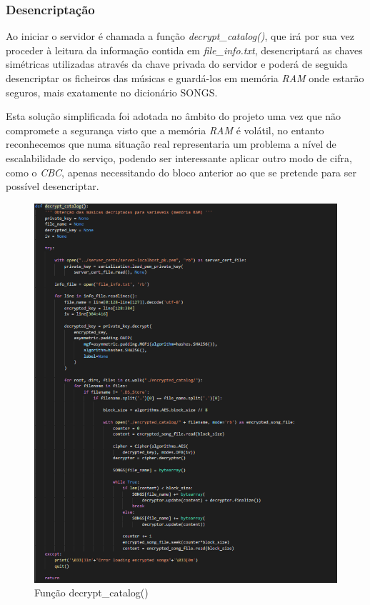 \documentclass[10pt,english]{article}
\begin{document}
\subsubsection{Desencriptação}
\par Ao iniciar o servidor é chamada a função \textit{decrypt\_catalog()}, que irá por sua vez proceder à leitura da informação contida em \textit{file\_info.txt}, desencriptará as chaves simétricas utilizadas através da chave privada do servidor e poderá de seguida desencriptar os ficheiros das músicas e guardá-los em memória \textit{RAM} onde estarão seguros, mais exatamente no dicionário SONGS.
\par Esta solução simplificada foi adotada no âmbito do projeto uma vez que não compromete a segurança visto que a memória \textit{RAM} é volátil, no entanto reconhecemos que numa situação real representaria um problema a nível de escalabilidade do serviço, podendo ser interessante aplicar outro modo de cifra, como o \textit{CBC}, apenas necessitando do bloco anterior ao que se pretende para ser possível desencriptar.

\begin{figure}[!h]
        \centering
        \includegraphics[width=500]{images/Decrypt catalog.png}
        \caption{Função decrypt\_catalog()}
\end{figure}
\end{document}
